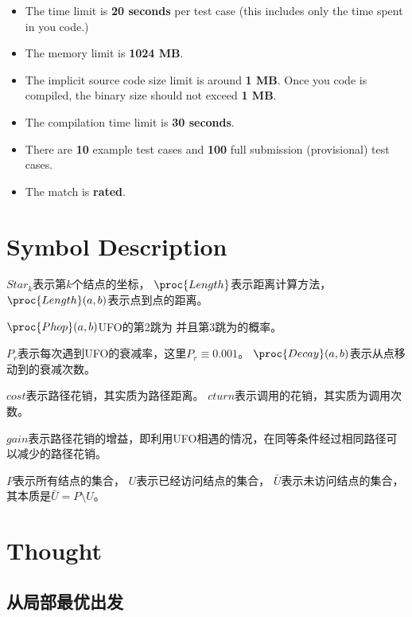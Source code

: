 \documentclass[hyperref,UTF8]{ctexart}
\theoremstyle{definition}
\theoremstyle{remark}
\numberwithin{equation}{subsection}
\newcommand{\Emph}{\textbf}
\begin{document}
	\begin{itemize}
	
		\item The time limit is \Emph{20 seconds} per test case (this includes only the time spent in you code.)
		
		\item The memory limit is \Emph{1024 MB}.
		
		\item The implicit source code size limit is around \Emph{1 MB}.
		Once you code is compiled, the binary size should not exceed \Emph{1 MB}.
		
		\item The compilation time limit is \Emph{30 seconds}.
		
		\item There are \Emph{10} example test cases and \Emph{100} full submission (provisional) test cases.

		\item The match is \Emph{rated}.
		
	\end{itemize}
	
\section{Symbol Description}
\label{sec:symbol_descrip}

	$Star_k$表示第$k$个结点的坐标，
	$\proc{Length}$表示距离计算方法，
	$\proc{Length}(a, b)$表示点到点的距离。
	
	$\proc{Phop}(a, b)$UFO的第2跳为 并且第3跳为的概率。
	
	$P_r$表示每次遇到UFO的衰减率，这里$P_r \equiv 0.001$。
	$\proc{Decay}(a, b)$表示从点移动到的衰减次数。
	
	$cost$表示路径花销，其实质为路径距离。
	$cturn$表示调用的花销，其实质为调用次数。
	
	$gain$表示路径花销的增益，即利用UFO相遇的情况，在同等条件经过相同路径可以减少的路径花销。
	
    $P$表示所有结点的集合，
	$U$表示已经访问结点的集合，
	$\bar{U}$表示未访问结点的集合，
	其本质是$\bar{U} = P \setminus U$。
	
\section{Thought}
\label{sec:thought}

\subsection{从局部最优出发}
\label{subsec:local_optimum}
\end{document}
